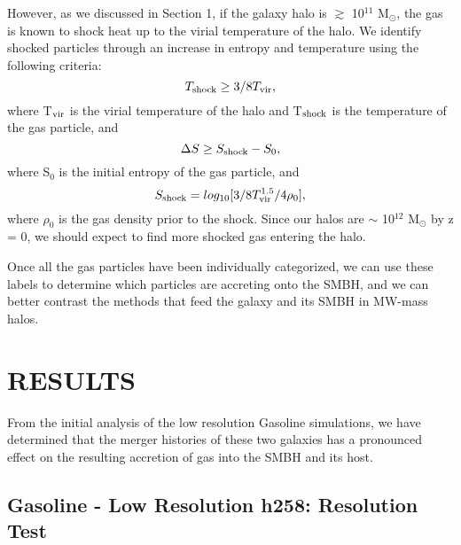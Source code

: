 \documentclass[12pt,headA,chapB]{fiskthesis}
\begin{document}
However, as we discussed in Section 1, if the galaxy halo is $\gtrsim$ 10$^{11}$ M$_{\odot} $, the gas is known to shock heat up to the virial temperature of the halo. We identify shocked particles through an increase in entropy and temperature using the following criteria:
\begin{equation}
T_{\rm shock} \geq 3/8 T_{\rm vir},
\end{equation}
where T$_{\rm vir}$ is the virial temperature of the halo and T$_{\rm shock}$ is the temperature of the gas particle, and 
\begin{equation}
\Delta S \geq S_{\rm shock} - S_0,
\end{equation}
where S$_0$ is the initial entropy of the gas particle, and 
\begin{equation}
S_{\rm shock} = log_{10}[3/8 T_{\rm vir}^{1.5}/4 \rho_0],
\end{equation}
where $\rho_0$ is the gas density prior to the shock. Since our halos are $\sim$ 10$^{12}$ M$_{\odot} $ by z = 0, we should expect to find more shocked gas entering the halo.

Once all the gas particles have been individually categorized, we can use these labels to determine which particles are accreting onto the SMBH, and we can better contrast the methods that feed the galaxy and its SMBH in MW-mass halos.


\chapter{\normalsize RESULTS}
\thispagestyle{empty}
From the initial analysis of the low resolution Gasoline simulations, we have determined that the merger histories of these two galaxies has a pronounced effect on the resulting accretion of gas into the SMBH and its host. 

\section{Gasoline - Low Resolution h258: Resolution Test}
	
\end{document}
